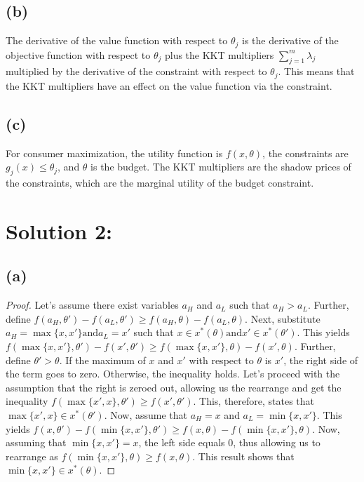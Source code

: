 \documentclass[10pt, a4paper]{article}
\begin{document}
    \subsection*{(b)}
        The derivative of the value function with respect to $\theta_j$ is the derivative of the objective function with respect to $\theta_j$ plus the KKT multipliers $\sum\limits_{j=1}^m\lambda_j$
        multiplied by the derivative of the constraint with respect to $\theta_j$. This means that the KKT multipliers have an effect on the value function via the constraint. 
    \subsection*{(c)}
        For consumer maximization, the utility function is $f(x,\theta)$, the constraints are $g_j(x)\leq\theta_j$, and $\theta$ is the budget. The KKT multipliers are the shadow prices of the constraints,
        which are the marginal utility of the budget constraint. 
\section*{Solution 2:}
    \subsection*{(a)}
        \begin{proof}
          Let's assume there exist variables $a_H$ and $a_L$ such that $a_H > a_L$. Further, define $f(a_H,\theta') - f(a_L,\theta') \geq f(a_H,\theta)-f(a_L,\theta)$. Next, substitute
          $a_H = \max\{x,x'\} \text{and} a_L = x'$ such that $x\in x^*(\theta) \text{and} x'\in x^*(\theta')$. This yields $f(\max\{x,x'\},\theta') - f(x',\theta') \geq f(\max\{x,x'\},\theta) - f(x',\theta)$.
          Further, define $\theta'>\theta$. If the maximum of $x$ and $x'$ with respect to $\theta$ is $x'$, the right side of the term goes to zero. Otherwise, the inequality holds. Let's
          proceed with the assumption that the right is zeroed out, allowing us the rearrange and get the inequality $f(\max\{x',x\},\theta')\geq f(x',\theta')$. This, therefore, states that 
          $\max\{x',x\} \in x^*(\theta')$. Now, assume that $a_H = x$ and $a_L = \min\{x,x'\}$. This yields $f(x,\theta') - f(\min\{x,x'\},\theta') \geq f(x,\theta) - f(\min\{x,x'\},\theta)$. 
          Now, assuming that $\min\{x,x'\} = x$, the left side equals 0, thus allowing us to rearrange as $f(\min\{x,x'\},\theta)\geq f(x,\theta)$. This result shows that $\min\{x,x'\}\in x^*(\theta)$.
      \end{proof}
\end{document}
